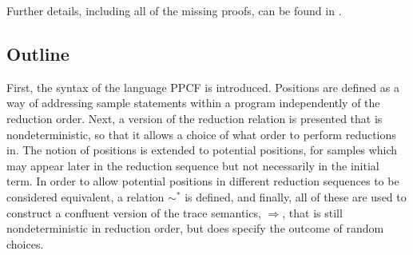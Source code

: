 Further details, including all of the missing proofs, can be found in \cite[\S IV, \S D]{arxiv}.

\subsection{Outline}
First, the syntax of the language PPCF is introduced. Positions are defined as a way of addressing sample statements within a program independently of the reduction order. Next, a version of the reduction relation is presented that is nondeterministic, so that it allows a choice of what order to perform reductions in. The notion of positions is extended to potential positions, for samples which may appear later in the reduction sequence but not necessarily in the initial term. In order to allow potential positions in different reduction sequences to be considered equivalent, a relation $\sim^*$ is defined, and finally, all of these are used to construct a confluent version of the trace semantics, $\Rightarrow$, that is still nondeterministic in reduction order, but does specify the outcome of random choices.
